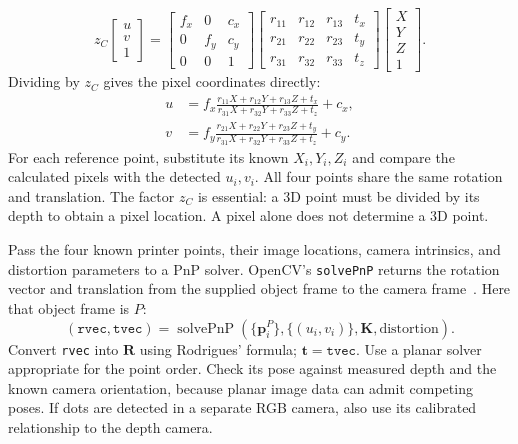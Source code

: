 \documentclass[11pt,letterpaper]{article}
\newcommand{\p}{\mathbf p}
\newcommand{\R}{\mathbf R}
\newcommand{\tr}{\mathbf t}
\newcommand{\K}{\mathbf K}
\begin{document}
\begin{equation}
 \boxed{z_C\begin{bmatrix}u\\v\\1\end{bmatrix}
 =
 \begin{bmatrix}f_x&0&c_x\\0&f_y&c_y\\0&0&1\end{bmatrix}
 \begin{bmatrix}
 r_{11}&r_{12}&r_{13}&t_x\\
 r_{21}&r_{22}&r_{23}&t_y\\
 r_{31}&r_{32}&r_{33}&t_z
 \end{bmatrix}
 \begin{bmatrix}X\\Y\\Z\\1\end{bmatrix}.}
 \label{eq:projection}
\end{equation}
Dividing by $z_C$ gives the pixel coordinates directly:
\begin{equation}
 \boxed{\begin{aligned}
 u&=f_x\frac{r_{11}X+r_{12}Y+r_{13}Z+t_x}
                 {r_{31}X+r_{32}Y+r_{33}Z+t_z}+c_x,\\[6pt]
 v&=f_y\frac{r_{21}X+r_{22}Y+r_{23}Z+t_y}
                 {r_{31}X+r_{32}Y+r_{33}Z+t_z}+c_y.
 \end{aligned}}
 \label{eq:pixel-components}
\end{equation}
For each reference point, substitute its known $X_i,Y_i,Z_i$ and compare
the calculated pixels with the detected $u_i,v_i$. All four points share
the same rotation and translation.
The factor $z_C$ is essential: a 3D point must be divided by its depth to
obtain a pixel location. A pixel alone does not determine a 3D point.

Pass the four known printer points, their image locations, camera intrinsics,
and distortion parameters to a PnP solver. OpenCV's \texttt{solvePnP} returns
the rotation vector and translation from the supplied object frame to the
camera frame~\cite{pnp}. Here that object frame is $P$:
\begin{equation}
 (\texttt{rvec},\texttt{tvec})
 =\operatorname{solvePnP}\!\left(
 \{\p_i^P\},\{(u_i,v_i)\},\K,\text{distortion}\right).
\end{equation}
Convert \texttt{rvec} into $\R$ using Rodrigues' formula; $\tr=\texttt{tvec}$.
Use a planar solver appropriate for the point order. Check its pose against
measured depth and the known camera orientation, because planar image data
can admit competing poses. If dots are detected in a separate RGB camera,
also use its calibrated relationship to the depth camera.
\end{document}
